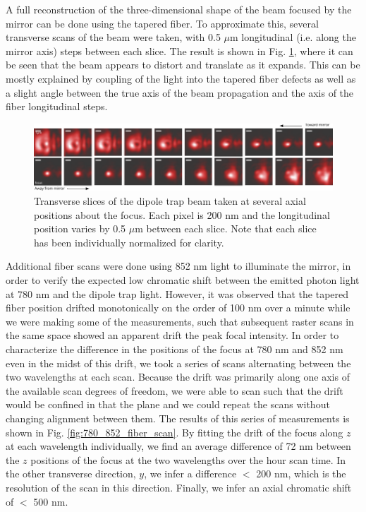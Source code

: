 A full reconstruction of the three-dimensional shape of the beam focused by the mirror can be done using the tapered fiber. To approximate this, several transverse scans of the beam were taken, with 0.5 $\mu$m longitudinal (i.e. along the mirror axis) steps between each slice. The result is shown in Fig. \ref{fig:fiber_scan_axial_steps}, where it can be seen that the beam appears to distort and translate as it expands. This can be mostly explained by coupling of the light into the tapered fiber defects as well as a slight angle between the true axis of the beam propagation and the axis of the fiber longitudinal steps. 

\begin{figure}
    \centering
    \includegraphics[width=\textwidth]{Images/fiber_scan_tranverse_slices.pdf}
    \caption{Transverse slices of the dipole trap beam taken at several axial positions about the focus. Each pixel is 200 nm and the longitudinal position varies by 0.5 $\mu$m between each slice. Note that each slice has been individually normalized for clarity.}
    \label{fig:fiber_scan_axial_steps}
\end{figure}

Additional fiber scans were done using 852 nm light to illuminate the mirror, in order to verify the expected low chromatic shift between the emitted photon light at 780 nm and the dipole trap light. However, it was observed that the tapered fiber position drifted monotonically on the order of 100 nm over a minute while we were making some of the measurements, such that subsequent raster scans in the same space showed an apparent drift the peak focal intensity. In order to characterize the difference in the positions of the focus at 780 nm and 852 nm even in the midst of this drift, we took a series of scans alternating between the two wavelengths at each scan. Because the drift was primarily along one axis of the available scan degrees of freedom, we were able to scan such that the drift would be confined in that the plane and we could repeat the scans without changing alignment between them. The results of this series of measurements is shown in Fig. \ref{fig:780_852_fiber_scan}. By fitting the drift of the focus along $z$ at each wavelength individually, we find an average difference of 72 nm between the $z$ positions of the focus at the two wavelengths over the hour scan time. In the other transverse direction, $y$, we infer a difference $<$ 200 nm, which is the resolution of the scan in this direction. Finally, we infer an axial chromatic shift of $<$ 500 nm.  

